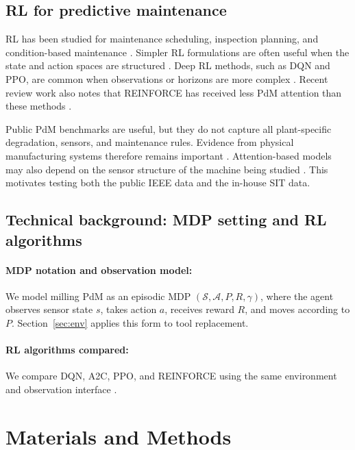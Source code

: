 \documentclass[sn-basic]{sn-jnl}%
\begin{document}
\subsection{RL for predictive maintenance}
RL has been studied for maintenance scheduling, inspection planning, and condition-based maintenance \cite{Siraskar2023, Ogunfowora2023, Zhang2024}. Simpler RL formulations are often useful when the state and action spaces are structured \cite{Adsule2020, Yousefi2020, Rasay2024, Dadash2024}. Deep RL methods, such as DQN and PPO, are common when observations or horizons are more complex \cite{Liu2020, Chen2023, Lee2022, Ong2022-02}. Recent review work also notes that \textsc{REINFORCE} has received less PdM attention than these methods \cite{Siraskar2025}.

Public PdM benchmarks are useful, but they do not capture all plant-specific degradation, sensors, and maintenance rules. Evidence from physical manufacturing systems therefore remains important \cite{Andrade2021Aircraft,Dangut2022RareFailure,Chen2024DigitalTwin}. Attention-based models may also depend on the sensor structure of the machine being studied \cite{Zhao2024}. This motivates testing both the public IEEE data and the in-house SIT data.

\subsection{Technical background: MDP setting and RL algorithms}
\label{sec:tech_background}
\paragraph{MDP notation and observation model:}
We model milling PdM as an episodic MDP $(\mathcal{S},\mathcal{A},P,R,\gamma)$, where the agent observes sensor state $s$, takes action $a$, receives reward $R$, and moves according to $P$. Section~\ref{sec:env} applies this form to tool replacement.

\paragraph{RL algorithms compared:}
We compare DQN, A2C, PPO, and \textsc{REINFORCE} using the same environment and observation interface \cite{Mnih2015, Schulman2017, Williams1992}.

\section{Materials and Methods}
\label{sec:method}
\end{document}
